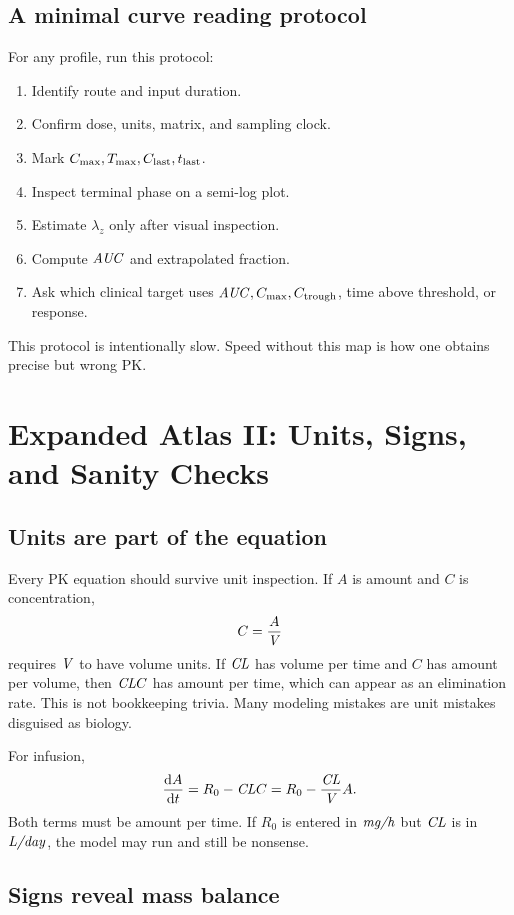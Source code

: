\subsection{A minimal curve reading protocol}

For any profile, run this protocol:
\begin{enumerate}[leftmargin=2em]
  \item Identify route and input duration.
  \item Confirm dose, units, matrix, and sampling clock.
  \item Mark \(C_{\max},T_{\max},C_{\mathrm{last}},t_{\mathrm{last}}\).
  \item Inspect terminal phase on a semi-log plot.
  \item Estimate \(\lambda_z\) only after visual inspection.
  \item Compute \(\pkAUC\) and extrapolated fraction.
  \item Ask which clinical target uses \(\pkAUC,\pkCmax,\pkCtrough\), time above threshold, or response.
\end{enumerate}
This protocol is intentionally slow. Speed without this map is how one obtains precise but wrong PK.

\section{Expanded Atlas II: Units, Signs, and Sanity Checks}

\subsection{Units are part of the equation}

Every PK equation should survive unit inspection. If \(A\) is amount and \(C\) is concentration,
\[
  C=\frac{A}{\pkV}
\]
requires \(\pkV\) to have volume units. If \(\pkCL\) has volume per time and \(C\) has amount per volume, then \(\pkCL C\) has amount per time, which can appear as an elimination rate. This is not bookkeeping trivia. Many modeling mistakes are unit mistakes disguised as biology.

For infusion,
\[
  \frac{\dd A}{\dd t}=R_0-\pkCL C
  =
  R_0-\frac{\pkCL}{\pkV}A.
\]
Both terms must be amount per time. If \(R_0\) is entered in \(\pksym{mg/h}\) but \(\pkCL\) is in \(\pksym{L/day}\), the model may run and still be nonsense.

\subsection{Signs reveal mass balance}

